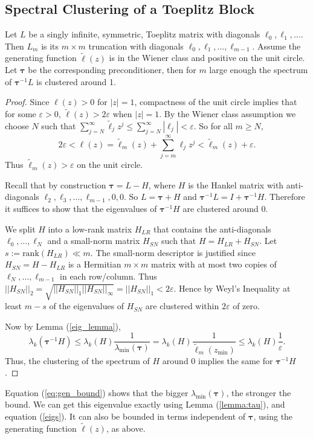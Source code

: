 \documentclass[review]{siamart251216}
\newcommand{\Hank}{{ H }}
\newcommand{\Toe}{{ L }}
\newcommand{\toe}{{ \ell }}
\newcommand{\toef}{{ \tilde{\toe}}}
\newcommand{\ptau}{{\bm{\tau}}}
\begin{document}
\subsection{Spectral Clustering of a Toeplitz Block} \label{sec:block}
\begin{lemma} \label{block}
	Let $\Toe$ be a singly infinite, symmetric, Toeplitz matrix with diagonals $\toe_0, \toe_1, \dots$. Then $\Toe_m$ is its $m \times m$ truncation with diagonals $\toe_0, \toe_1, \dots, \toe_{m-1}$. Assume the generating function $\toef(z)$ is in the Wiener class and positive on the unit circle. Let $\ptau$ be the corresponding preconditioner, then for $m$ large enough the spectrum of $\ptau^{-1} \Toe$ is clustered around 1. 
\end{lemma}
\begin{proof}
	Since $\toe(z) > 0$ for $|z|=1$, compactness of the unit circle implies that for some $\varepsilon > 0$, $\toef(z) > 2 \varepsilon$ when $|z|= 1$. By the Wiener class assumption we choose $N$ such that $\sum_{j=N}^{\infty} \toef_j z^j \leq \sum_{j=N}^{\infty} |\toe_j| < \varepsilon$. So for all $m \geq N$, 
	$$ 2 \varepsilon < \toe(z) = \toef_m(z) + \sum_{j=m}^{\infty} \toe_j z^j < \toef_m(z) + \varepsilon.$$
	Thus $\toef_m(z) > \varepsilon$ on the unit circle. 

Recall that by construction $\ptau= \Toe - \Hank$, where $\Hank$ is the Hankel matrix with anti-diagonals $\toe_2, \toe_3, \dots, \toe_{m-1},0,0$. So  $\Toe = \ptau + \Hank$ and $\ptau^{-1} \Toe = I + \ptau^{-1} \Hank $. Therefore it suffices to show that the eigenvalues of $\ptau^{-1} \Hank$ are clustered around 0. 

We split $\Hank$ into a low-rank matrix $\Hank_{LR}$ that contains the anti-diagonals $\toe_0, \dots, \toe_N$ and a small-norm matrix $\Hank_{SN}$ such that $\Hank = \Hank_{LR} + \Hank_{SN}$.  Let $s := \text{rank}(\Hank_{LR}) \ll m$. The small-norm descriptor is justified since $\Hank_{SN} = \Hank - \Hank_{LR}$ is a Hermitian $m \times m$ matrix with at most two copies of $\toe_{N}, \dots, \toe_{m-1}$ in each row/column. Thus $||\Hank_{SN}||_2 = \sqrt{||\Hank_{SN}||_1 ||\Hank_{SN}||_{\infty}} = ||\Hank_{SN}||_1 < 2 \varepsilon$. Hence by Weyl's Inequality at least $m-s$ of the eigenvalues of $\Hank_{SN}$ are clustered within $2 \varepsilon$ of zero. 

Now by Lemma (\ref{eig_lemma}),
\begin{equation}  \label{eq:gen_bound}
	\lambda_k ( \ptau^{-1} \Hank  ) \leq \lambda_k (\Hank)  \frac{1}{\lambda_{\min}(\ptau )}  = \lambda_k (\Hank)  \frac{1}{\toef_m(z_{\min})} \leq \lambda_k (\Hank)  \frac{1}{\varepsilon}.
\end{equation}
Thus, the clustering of the spectrum of $\Hank$ around 0 implies the same for $\ptau^{-1} \Hank$. 
\end{proof}
Equation (\ref{eq:gen_bound}) shows that the bigger $\lambda_{\min}(\ptau)$, the stronger the bound. We can get this eigenvalue exactly using Lemma (\ref{lemma:tau}), and equation (\ref{eigs}). It can also be bounded in terms independent of $\ptau$, using the generating function $\toef(z)$, as above. 
\end{document}
